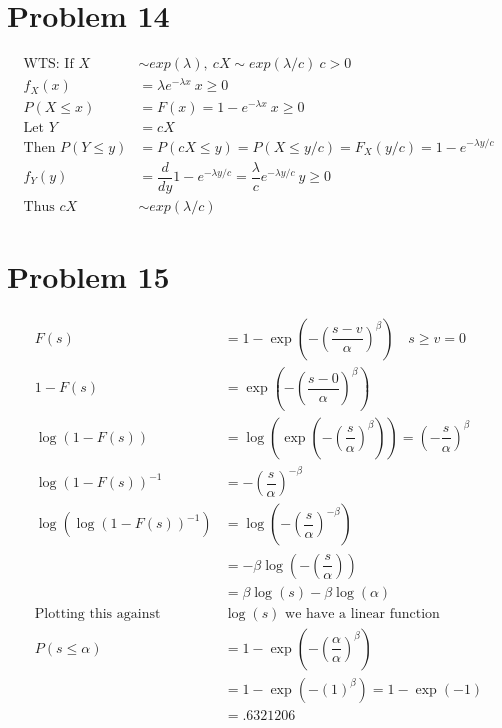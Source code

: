 \documentclass{article}
\begin{document}
\begin{flushleft}
\section*{Problem 14}
\begin{align*}
\text{WTS: If } X &\sim exp(\lambda), \ cX\sim exp(\lambda/c) \ c>0\\
f_X(x)&=\lambda e^{-\lambda x} \ x\geq 0\\
P(X\leq x)&=F(x)=1-e^{-\lambda x} \ x\geq 0\\
\text{Let } Y&=cX\\
\text{Then } P(Y\leq y)&=P(cX\leq y)=P(X \leq y/c)=F_X(y/c)=1-e^{-\lambda y/c}\\
f_Y(y)&=\dfrac{d}{dy} 1-e^{-\lambda y/c}=\dfrac{\lambda}{c}e^{-\lambda y/c} \ y\geq 0\\
\text{Thus } cX &\sim exp(\lambda/c)
\end{align*}
\section*{Problem 15}
\begin{align*}
F(s)&=1-\exp(-(\dfrac{s-v}{\alpha})^{\beta}) \quad s \geq v=0\\
1-F(s)&=\exp(-(\dfrac{s-0}{\alpha})^{\beta})\\
\log(1-F(s))&=\log(\exp(-(\dfrac{s}{\alpha})^{\beta}))=(-\dfrac{s}{\alpha})^{\beta}\\
\log(1-F(s))^{-1}&=-(\dfrac{s}{\alpha})^{-\beta}\\
\log(\log(1-F(s))^{-1})&=\log(-(\dfrac{s}{\alpha})^{-\beta})\\
&=-\beta \log(-(\dfrac{s}{\alpha}))\\
&=\beta\log(s)-\beta\log(\alpha)\\
\text{Plotting this against } &\log(s) \text{ we have a linear function}\\
P(s\leq \alpha)&=1-\exp(-(\dfrac{\alpha}{\alpha})^{\beta})\\
&=1-\exp(-(1)^{\beta})=1-\exp(-1)\\
&=.6321206
\end{align*}

\end{flushleft}
\end{document}
